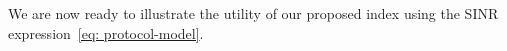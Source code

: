 \documentclass[12pt, draftclsnofoot, onecolumn]{IEEEtran}
\begin{document}
We are now ready to illustrate the utility of our proposed index using the SINR expression~\eqref{eq: protocol-model}.
\end{document}

